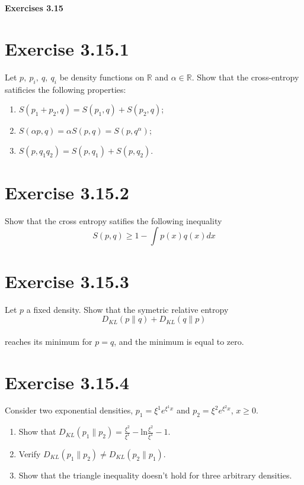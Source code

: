 \documentclass{exam}
\begin{document}
\begin{center}
    \textbf{\Large Exercises 3.15 }
\end{center}

\section*{Exercise 3.15.1}
Let $p, \ p_i, \ q, \ q_i$ be density functions on $\mathbb{R}$ and $\alpha \in \mathbb{R}$. Show that the cross-entropy satificies the following properties:
\begin{enumerate}
    \item $S(p_1 + p_2,q) = S(p_1,q) + S(p_2,q)$;
    \item $S(\alpha p,q) = \alpha S(p,q) = S(p,q^{\alpha})$;
    \item $S(p, q_1 q_2) = S(p,q_1) + S(p,q_2)$.
\end{enumerate}

\section*{Exercise 3.15.2}
Show that the cross entropy satifies the following inequality\\
\begin{equation*}
    S(p,q) \geq 1 - \displaystyle\int p(x) q(x) d x
\end{equation*}    

\section*{Exercise 3.15.3}
Let $p$ a fixed density. Show that the symetric relative entropy \\
\begin{equation*}
    D_{KL}(p \lVert q) +  D_{KL}(q \lVert p )
\end{equation*}\\
reaches its minimum for $p = q$, and the minimum is equal to zero. 

\section*{Exercise 3.15.4}
Consider two exponential densities, $p_1 = \xi^1 e^{\xi^1 x}$ and $p_2 = \xi^2 e^{\xi^2 x}$, $x \geq 0$.
\begin{enumerate}
    \item Show that $D_{KL}(p_1 \lVert p_2) = \displaystyle \frac{\xi^2}{\xi^1} - \text{ln}\frac{\xi^2}{\xi^1} - 1$.  
    \item Verify $D_{KL}(p_1 \lVert p_2) \neq D_{KL}(p_2 \lVert p_1 )$.
    \item Show that the triangle inequality doesn't hold for three arbitrary densities. 
\end{enumerate}    
\end{document}
